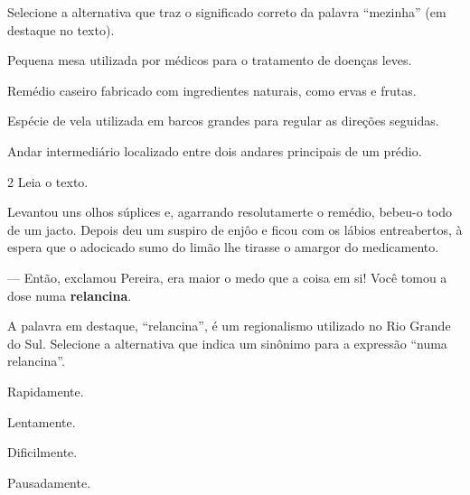\noindent{}Selecione a alternativa que traz o significado correto da palavra “mezinha” (em destaque no texto).

\begin{escolha}
\item Pequena mesa utilizada por médicos para o tratamento de doenças leves.

\item Remédio caseiro fabricado com ingredientes naturais, como ervas e frutas.

\item Espécie de vela utilizada em barcos grandes para regular as direções seguidas.

\item Andar intermediário localizado entre dois andares principais de um prédio.
\end{escolha}



\num{2} Leia o texto.

\begin{myquote}
Levantou uns olhos súplices e, agarrando resolutamerte o remédio,
bebeu-o todo de um jacto. Depois deu um suspiro de enjôo e ficou com os
lábios entreabertos, à espera que o adocicado sumo do limão lhe tirasse
o amargor do medicamento.

— Então, exclamou Pereira, era maior o medo que a coisa em si! Você
tomou a dose numa \textbf{relancina}.

\end{myquote}

A palavra em destaque, “relancina”, é um regionalismo
utilizado no Rio Grande do Sul. Selecione a alternativa que indica um sinônimo
para a expressão “numa relancina”.

\begin{minipage}{.5\textwidth}
\begin{escolha}
\item Rapidamente.

\item Lentamente.

\item Dificilmente.

\item Pausadamente.
\end{escolha}
\end{minipage}


